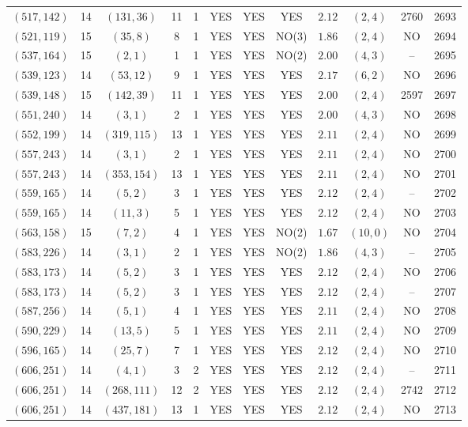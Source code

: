 \begin{longtable}{|c|c|c|c|c|c|c|c|c|c|c|c|}
$(517,142)$ & 14 & $(131,36)$ & 11 & 1 & YES & YES & YES & $2.12$ & $(2,4)$ & 2760 & 2693\\
$(521,119)$ & 15 & $(35,8)$ & 8 & 1 & YES & YES & NO(3) & $1.86$ & $(2,4)$ & NO & 2694\\
$(537,164)$ & 15 & $(2,1)$ & 1 & 1 & YES & YES & NO(2) & $2.00$ & $(4,3)$ & -- & 2695\\
$(539,123)$ & 14 & $(53,12)$ & 9 & 1 & YES & YES & YES & $2.17$ & $(6,2)$ & NO & 2696\\
$(539,148)$ & 15 & $(142,39)$ & 11 & 1 & YES & YES & YES & $2.00$ & $(2,4)$ & 2597 & 2697\\
$(551,240)$ & 14 & $(3,1)$ & 2 & 1 & YES & YES & YES & $2.00$ & $(4,3)$ & NO & 2698\\
$(552,199)$ & 14 & $(319,115)$ & 13 & 1 & YES & YES & YES & $2.11$ & $(2,4)$ & NO & 2699\\
$(557,243)$ & 14 & $(3,1)$ & 2 & 1 & YES & YES & YES & $2.11$ & $(2,4)$ & NO & 2700\\
$(557,243)$ & 14 & $(353,154)$ & 13 & 1 & YES & YES & YES & $2.11$ & $(2,4)$ & NO & 2701\\
$(559,165)$ & 14 & $(5,2)$ & 3 & 1 & YES & YES & YES & $2.12$ & $(2,4)$ & -- & 2702\\
$(559,165)$ & 14 & $(11,3)$ & 5 & 1 & YES & YES & YES & $2.12$ & $(2,4)$ & NO & 2703\\
$(563,158)$ & 15 & $(7,2)$ & 4 & 1 & YES & YES & NO(2) & $1.67$ & $(10,0)$ & NO & 2704\\
$(583,226)$ & 14 & $(3,1)$ & 2 & 1 & YES & YES & NO(2) & $1.86$ & $(4,3)$ & -- & 2705\\
$(583,173)$ & 14 & $(5,2)$ & 3 & 1 & YES & YES & YES & $2.12$ & $(2,4)$ & NO & 2706\\
$(583,173)$ & 14 & $(5,2)$ & 3 & 1 & YES & YES & YES & $2.12$ & $(2,4)$ & -- & 2707\\
$(587,256)$ & 14 & $(5,1)$ & 4 & 1 & YES & YES & YES & $2.11$ & $(2,4)$ & NO & 2708\\
$(590,229)$ & 14 & $(13,5)$ & 5 & 1 & YES & YES & YES & $2.11$ & $(2,4)$ & NO & 2709\\
$(596,165)$ & 14 & $(25,7)$ & 7 & 1 & YES & YES & YES & $2.12$ & $(2,4)$ & NO & 2710\\
$(606,251)$ & 14 & $(4,1)$ & 3 & 2 & YES & YES & YES & $2.12$ & $(2,4)$ & -- & 2711\\
$(606,251)$ & 14 & $(268,111)$ & 12 & 2 & YES & YES & YES & $2.12$ & $(2,4)$ & 2742 & 2712\\
$(606,251)$ & 14 & $(437,181)$ & 13 & 1 & YES & YES & YES & $2.12$ & $(2,4)$ & NO & 2713\\

\end{longtable}

